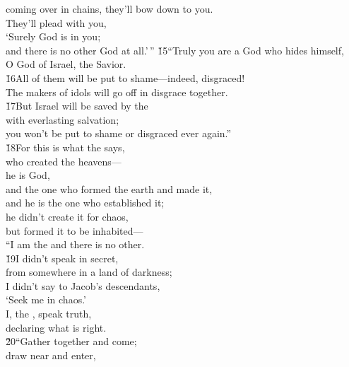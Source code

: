 \begin{poetry}
\poemlll       coming over in chains, they'll bow down to you. \\
\poeml They'll plead with you, \\
\poemll    `Surely God is in you; \\
\poemlll       and there is no other God at all.'\,''
\poeml \v{15}``Truly you are a God who hides himself, \\
\poemll    O God of Israel, the Savior. \\
\poeml \v{16}All of them will be put to shame---indeed, disgraced! \\
\poemll    The makers of idols will go off in disgrace together. \\
\poeml \v{17}But Israel will be saved by the  \\
\poemll    with everlasting salvation; \\
\poeml you won't be put to shame or disgraced ever again.'' \\
\poeml \v{18}For this is what the  says, \\
\poemll    who created the heavens--- \\
\poeml he is God, \\
\poemll    and the one who formed the earth and made it, \\
\poeml and he is the one who established it; \\
\poemll    he didn't create it for chaos, \\
\poemlll       but formed it to be inhabited--- \\
\poeml ``I am the  and there is no other. \\
\poeml \v{19}I didn't speak in secret, \\
\poemlll       from somewhere in a land of darkness; \\
\poeml I didn't say to Jacob's descendants, \\
\poemll    `Seek me in chaos.' \\
\poeml I, the , speak truth, \\
\poemll    declaring what is right. \\
\poeml \v{20}``Gather together and come; \\
\poemll    draw near and enter, \\

\end{poetry}
